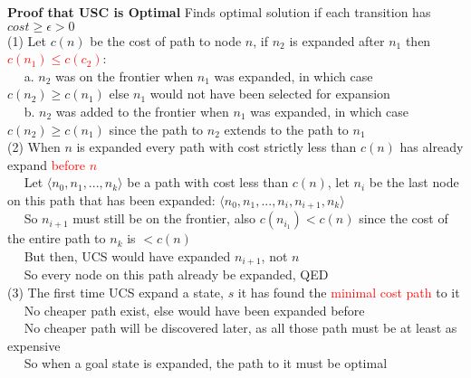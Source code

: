 \documentclass[10pt,landscape]{article}
\begin{document}
\begin{multicols}{2}
\textbf{Proof that USC is Optimal}
Finds optimal solution if each transition has $cost \ge \epsilon > 0$ \\
(1) Let $c(n)$ be the cost of path to node $n$, if $n_2$ is expanded after $n_1$ then \textcolor{red}{$c(n_1) \le c(c_2)$}: \\
$\quad$ a. $n_2$ was on the frontier when $n_1$ was expanded, in which case $c(n_2) \ge c(n_1)$ else $n_1$ would not have been selected for expansion \\
$\quad$ b. $n_2$ was added to the frontier when $n_1$ was expanded, in which case $c(n_2) \ge c(n_1)$ since the path to $n_2$ extends to the path to $n_1$ \\
(2) When $n$ is expanded every path with cost strictly less than $c(n)$ has already expand \textcolor{red}{before $n$} \\
$\quad$ Let $\langle n_0, n_1, ..., n_k \rangle$ be a path with cost less than $c(n)$, let $n_i$ be the last node on this path that has been expanded: $\langle n_0, n_1, ..., n_i, n_{i+1}, n_k \rangle$\\
$\quad$ So $n_{i+1}$ must still be on the frontier, also $c(n_{i_1}) < c(n)$ since the cost of the entire path to $n_k$ is $< c(n)$ \\
$\quad$ But then, UCS would have expanded $n_{i+1}$, not $n$ \\
$\quad$ So every node on this path already be expanded, QED \\
(3) The first time UCS expand a state, $s$ it has found the \textcolor{red}{minimal cost path} to it \\
$\quad$ No cheaper path exist, else would have been expanded before \\
$\quad$ No cheaper path will be discovered later, as all those path must be at least as expensive \\
$\quad$ So when a goal state is expanded, the path to it must be optimal



\end{multicols}
\end{document}
